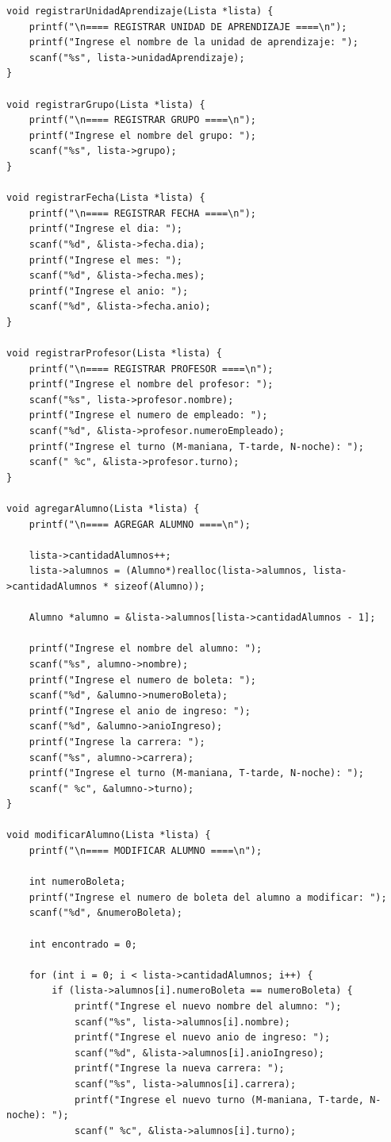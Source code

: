 \documentclass{article}
\begin{document}
\begin{lstlisting}
void registrarUnidadAprendizaje(Lista *lista) {
	printf("\n==== REGISTRAR UNIDAD DE APRENDIZAJE ====\n");
	printf("Ingrese el nombre de la unidad de aprendizaje: ");
	scanf("%s", lista->unidadAprendizaje);
}

void registrarGrupo(Lista *lista) {
	printf("\n==== REGISTRAR GRUPO ====\n");
	printf("Ingrese el nombre del grupo: ");
	scanf("%s", lista->grupo);
}

void registrarFecha(Lista *lista) {
	printf("\n==== REGISTRAR FECHA ====\n");
	printf("Ingrese el dia: ");
	scanf("%d", &lista->fecha.dia);
	printf("Ingrese el mes: ");
	scanf("%d", &lista->fecha.mes);
	printf("Ingrese el anio: ");
	scanf("%d", &lista->fecha.anio);
}

void registrarProfesor(Lista *lista) {
	printf("\n==== REGISTRAR PROFESOR ====\n");
	printf("Ingrese el nombre del profesor: ");
	scanf("%s", lista->profesor.nombre);
	printf("Ingrese el numero de empleado: ");
	scanf("%d", &lista->profesor.numeroEmpleado);
	printf("Ingrese el turno (M-maniana, T-tarde, N-noche): ");
	scanf(" %c", &lista->profesor.turno);
}

void agregarAlumno(Lista *lista) {
	printf("\n==== AGREGAR ALUMNO ====\n");
	
	lista->cantidadAlumnos++;
	lista->alumnos = (Alumno*)realloc(lista->alumnos, lista->cantidadAlumnos * sizeof(Alumno));
	
	Alumno *alumno = &lista->alumnos[lista->cantidadAlumnos - 1];
	
	printf("Ingrese el nombre del alumno: ");
	scanf("%s", alumno->nombre);
	printf("Ingrese el numero de boleta: ");
	scanf("%d", &alumno->numeroBoleta);
	printf("Ingrese el anio de ingreso: ");
	scanf("%d", &alumno->anioIngreso);
	printf("Ingrese la carrera: ");
	scanf("%s", alumno->carrera);
	printf("Ingrese el turno (M-maniana, T-tarde, N-noche): ");
	scanf(" %c", &alumno->turno);
}

void modificarAlumno(Lista *lista) {
	printf("\n==== MODIFICAR ALUMNO ====\n");
	
	int numeroBoleta;
	printf("Ingrese el numero de boleta del alumno a modificar: ");
	scanf("%d", &numeroBoleta);
	
	int encontrado = 0;
	
	for (int i = 0; i < lista->cantidadAlumnos; i++) {
		if (lista->alumnos[i].numeroBoleta == numeroBoleta) {
			printf("Ingrese el nuevo nombre del alumno: ");
			scanf("%s", lista->alumnos[i].nombre);
			printf("Ingrese el nuevo anio de ingreso: ");
			scanf("%d", &lista->alumnos[i].anioIngreso);
			printf("Ingrese la nueva carrera: ");
			scanf("%s", lista->alumnos[i].carrera);
			printf("Ingrese el nuevo turno (M-maniana, T-tarde, N-noche): ");
			scanf(" %c", &lista->alumnos[i].turno);
			

\end{lstlisting}
\end{document}
